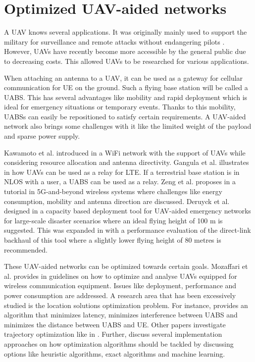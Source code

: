\section{Optimized UAV-aided networks}

A \gls{UAV} knows several applications. It was originally mainly used to support the military for surveillance and remote attacks without 
endangering pilots \cite{U12}. However, \gls{UAV}s have recently become more accessible by the general public due to decreasing costs. This 
allowed \gls{UAV}s to be researched for various applications.

When attaching an antenna to a \gls{UAV}, it can be used as a gateway for cellular communication for \gls{UE} on the ground.
Such a flying base station will be called a \gls{UABS}. 
This has several advantages like mobility and rapid deployment which is ideal for emergency situations or temporary events. Thanks to this mobility,  
\gls{UABS}s can easily be repositioned to satisfy certain requirements. A \gls{UAV}-aided network also brings some challenges with it like 
the limited weight of the payload and sparse power supply.

Kawamoto et al. introduced in \cite{U11} a WiFi network with the support of  \gls{UAV}s while considering resource allocation 
and antenna directivity. 
Gangula et al. illustrates in \cite{U10} how \gls{UAV}s can be  used as a relay for \gls{LTE}. 
If a terrestrial base station is in \gls{NLOS} with a user, a
\gls{UABS} can be used as a relay.
Zeng et al. proposes in  \cite{U12} a tutorial in 5G-and-beyond wireless systems where challenges like 
energy consumption, mobility and antenna direction are discussed. 
Deruyck et al. designed in \cite{J2} a capacity based deployment tool for UAV-aided emergency
networks for large-scale disaster scenarios where an ideal flying height of 100 m is suggested. This was expanded 
in \cite{U1} with a performance evaluation of the direct-link backhaul of this tool where a slightly lower 
flying height of 80 metres is recommended.

These \gls{UAV}-aided networks can be optimized towards certain goals.
Mozaffari et al. provides in \cite{U3} guidelines on how to optimize and analyse \gls{UAV}s equipped for 
wireless communication equipment. Issues like deployment, performance and power consumption are addressed.
A research area that has been excessively studied is the location solutions optimization problem.
For instance, \cite{U4} provides an algorithm that minimizes latency, \cite{U7,U9}  minimizes interference between \gls{UABS} and \cite{U8} minimizes the 
distance between \gls{UABS} and \gls{UE}. Other papers investigate trajectory optimization like in \cite{U7,U6}.
Further, \cite{U3,U5} discuss several implementation approaches on how optimization algorithms should be tackled by discussing options like 
heuristic algorithms, \gls{exact algorithm}s and machine learning. 

